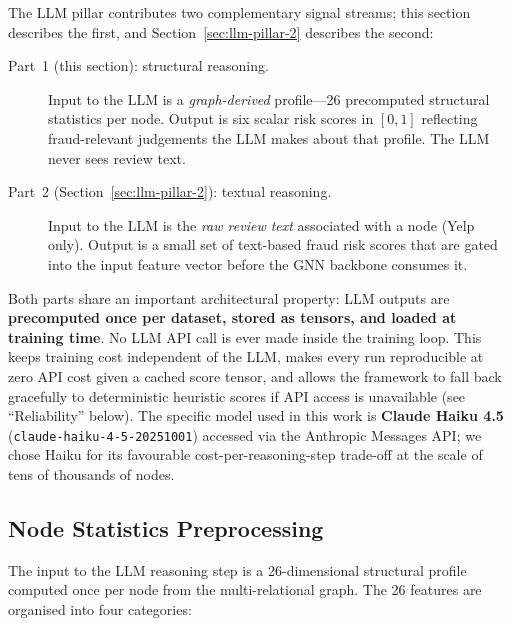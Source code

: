 The LLM pillar contributes two complementary signal streams; this section describes the first, and Section~\ref{sec:llm-pillar-2} describes the second:

\begin{description}
    \item[Part~1 (this section): structural reasoning.] Input to the LLM is a \emph{graph-derived} profile---26 precomputed structural statistics per node. Output is six scalar risk scores in $[0,1]$ reflecting fraud-relevant judgements the LLM makes about that profile. The LLM never sees review text.
    \item[Part~2 (Section~\ref{sec:llm-pillar-2}): textual reasoning.] Input to the LLM is the \emph{raw review text} associated with a node (Yelp only). Output is a small set of text-based fraud risk scores that are gated into the input feature vector before the GNN backbone consumes it.
\end{description}

Both parts share an important architectural property: LLM outputs are \textbf{precomputed once per dataset, stored as tensors, and loaded at training time}. No LLM API call is ever made inside the training loop. This keeps training cost independent of the LLM, makes every run reproducible at zero API cost given a cached score tensor, and allows the framework to fall back gracefully to deterministic heuristic scores if API access is unavailable (see ``Reliability'' below). The specific model used in this work is \textbf{Claude Haiku 4.5} (\texttt{claude-haiku-4-5-20251001}) accessed via the Anthropic Messages API; we chose Haiku for its favourable cost-per-reasoning-step trade-off at the scale of tens of thousands of nodes.

\subsection{Node Statistics Preprocessing}
\label{sec:node-statistics}

The input to the LLM reasoning step is a 26-dimensional structural profile computed once per node from the multi-relational graph. The 26 features are organised into four categories:

